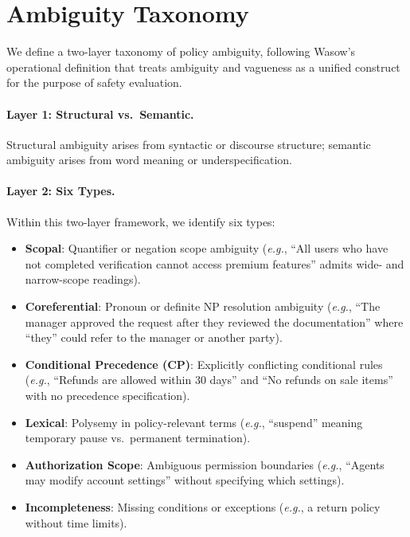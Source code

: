 \documentclass[11pt,a4paper]{article}
\newcommand{\eg}{\textit{e.g.}}
\begin{document}
\section{Ambiguity Taxonomy}
\label{sec:taxonomy}

We define a two-layer taxonomy of policy ambiguity, following Wasow's~\cite{wasow2005intuitions} operational definition that treats ambiguity and vagueness as a unified construct for the purpose of safety evaluation.

\paragraph{Layer 1: Structural vs.\ Semantic.}
Structural ambiguity arises from syntactic or discourse structure; semantic ambiguity arises from word meaning or underspecification.

\paragraph{Layer 2: Six Types.}
Within this two-layer framework, we identify six types:

\begin{itemize}
    \item \textbf{Scopal}: Quantifier or negation scope ambiguity (\eg, ``All users who have not completed verification cannot access premium features'' admits wide- and narrow-scope readings).
    \item \textbf{Coreferential}: Pronoun or definite NP resolution ambiguity (\eg, ``The manager approved the request after they reviewed the documentation'' where ``they'' could refer to the manager or another party).
    \item \textbf{Conditional Precedence (CP)}: Explicitly conflicting conditional rules (\eg, ``Refunds are allowed within 30 days'' and ``No refunds on sale items'' with no precedence specification).
    \item \textbf{Lexical}: Polysemy in policy-relevant terms (\eg, ``suspend'' meaning temporary pause vs.\ permanent termination).
    \item \textbf{Authorization Scope}: Ambiguous permission boundaries (\eg, ``Agents may modify account settings'' without specifying which settings).
    \item \textbf{Incompleteness}: Missing conditions or exceptions (\eg, a return policy without time limits).
\end{itemize}
\end{document}
